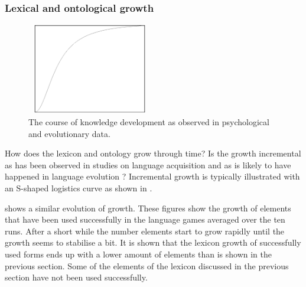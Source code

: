 \subsubsection{Lexical and ontological growth}

\begin{figure}
\centerline{\includegraphics[width=5.5cm,height=4cm]{basic/growth.eps}}
\caption{The course of knowledge development as observed in psychological and evolutionary data.}
\label{f:st:growth}
\end{figure}

How does the lexicon and ontology grow through time? Is the growth incremental as has been observed in studies on language acquisition and as is likely to have happened in language evolution \citep{aitchison:1996}? Incremental growth is typically illustrated with an S-shaped logistics curve as shown in .

 shows a similar evolution of growth. These figures show the growth of elements that have been used successfully in the language games averaged over the ten runs. After a short while the number elements start to grow rapidly until the growth seems to stabilise a bit. It is shown that the lexicon growth of successfully used forms ends up with a lower amount of elements than is shown in the previous section. Some of the elements of the lexicon discussed in the previous section have not been used successfully.

